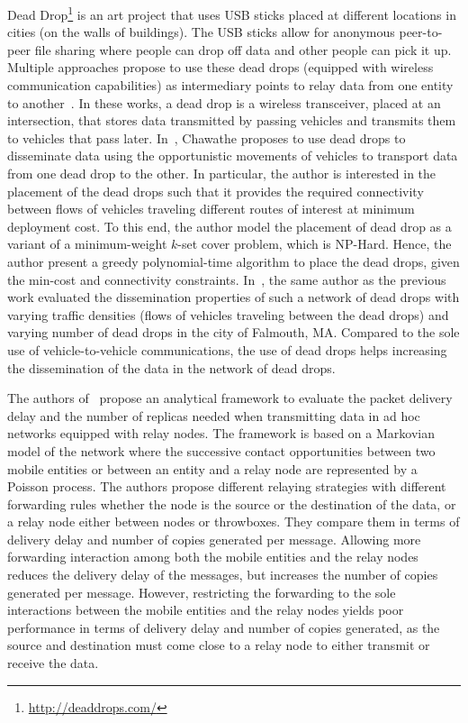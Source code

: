Dead Drop\footnote{\url{http://deaddrops.com/}} is an art project that uses USB sticks placed at different locations in cities (\eg on the walls of buildings). The USB sticks allow for anonymous peer-to-peer file sharing where people can drop off  data and other people can pick it up. Multiple approaches propose to use these dead drops (equipped with wireless communication capabilities) as intermediary points to relay data from one entity to another~\cite{chawathe2006inter,chawathe2008using,lok2009data}. In these works, a dead drop is a wireless transceiver, placed at an intersection, that stores data transmitted by passing vehicles and transmits them to vehicles that pass later. In~\cite{chawathe2006inter}, Chawathe proposes to use dead drops to disseminate data using the opportunistic movements of vehicles to transport data from one dead drop to the other. In particular, the author is interested in the placement of the dead drops such that it provides the required connectivity between flows of vehicles traveling different routes of interest at minimum deployment cost. To this end, the author model the placement of dead drop as a variant of a minimum-weight $k$-set cover problem, which is NP-Hard. Hence, the author present a greedy polynomial-time algorithm to place the dead drops, given the min-cost and connectivity constraints. In~\cite{chawathe2008using}, the same author as the previous work evaluated the dissemination properties of such a network of dead drops with varying traffic densities (\eg flows of vehicles traveling between the dead drops) and varying number of dead drops in the city of Falmouth, MA. Compared to the sole use of vehicle-to-vehicle communications, the use of dead drops helps increasing the dissemination of the data in the network of dead drops.

The authors of~\cite{ibrahim2009analysis} propose an analytical framework to evaluate the packet delivery delay and the number of replicas needed when transmitting data in ad hoc networks equipped with relay nodes. The framework is based on a Markovian model of the network where the successive contact opportunities between two mobile entities or between an entity and a relay node are represented by a Poisson process. The authors propose different relaying strategies with different forwarding rules whether the node is the source or the destination of the data, or a relay node either between nodes or throwboxes. They compare them in terms of delivery delay and number of copies generated per message. Allowing more forwarding interaction among both the mobile entities and the relay nodes reduces the delivery delay of the messages, but increases the number of copies generated per message. However, restricting the forwarding to the sole interactions between the mobile entities and the relay nodes yields poor performance in terms of delivery delay and number of copies generated, as the source and destination must come close to a relay node to either transmit or receive the data.

